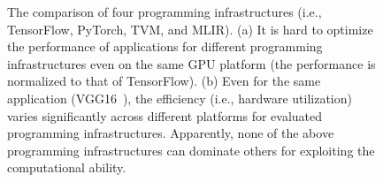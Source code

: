 
\begin{figure}[t]
\centering
  \vspace{-8pt}
\caption{\footnotesize The comparison of four programming infrastructures (i.e., TensorFlow, PyTorch, TVM, and MLIR). (a) It is hard to optimize the performance of applications for different programming infrastructures even on the same GPU platform (the performance is normalized to that of TensorFlow). (b) Even for the same application (VGG16~\cite{simonyan2014very}), the efficiency (i.e., hardware utilization) varies significantly across different platforms for evaluated programming infrastructures. Apparently, none of the above programming infrastructures can dominate others for exploiting the computational ability.}

\end{figure}
